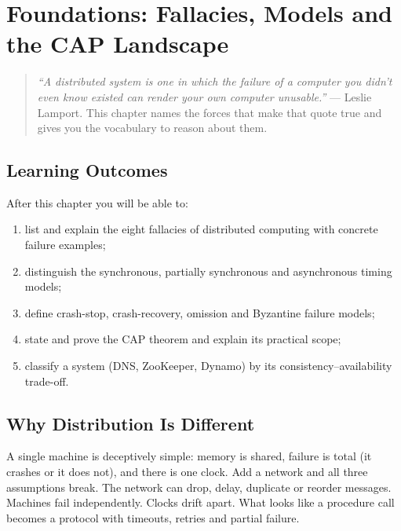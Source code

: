 \chapter{Foundations: Fallacies, Models and the CAP Landscape}
\label{ch:foundations}

\begin{quote}
\emph{``A distributed system is one in which the failure of a computer you didn't even know existed can render your own computer unusable.''} --- Leslie Lamport. This chapter names the forces that make that quote true and gives you the vocabulary to reason about them.
\end{quote}

\noindent{}
\vspace{0.4em}

\section*{Learning Outcomes}
After this chapter you will be able to:
\begin{enumerate}[label=(L\arabic*)]
    \item list and explain the eight fallacies of distributed computing with concrete failure examples;
    \item distinguish the synchronous, partially synchronous and asynchronous timing models;
    \item define crash-stop, crash-recovery, omission and Byzantine failure models;
    \item state and prove the CAP theorem and explain its practical scope;
    \item classify a system (DNS, ZooKeeper, Dynamo) by its consistency--availability trade-off.
\end{enumerate}

\section{Why Distribution Is Different}
\label{sec:why-distributed}
A single machine is deceptively simple: memory is shared, failure is total (it crashes or it does not), and there is one clock. Add a network and all three assumptions break. The network can drop, delay, duplicate or reorder messages. Machines fail independently. Clocks drift apart. What looks like a procedure call becomes a protocol with timeouts, retries and partial failure.

